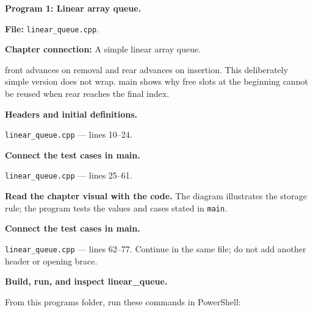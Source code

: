 \textbf{Program 1: Linear array queue.}

\textbf{File:} \texttt{linear\_queue.cpp}.

\textbf{Chapter connection:} A simple linear array queue.

front advances on removal and rear advances on insertion. This deliberately simple version does not wrap. main shows why free slots at the beginning cannot be reused when rear reaches the final index.



\begin{utpsteps}\setcounter{enumi}{0}\item \textbf{Headers and initial definitions.}\end{utpsteps}

\texttt{linear\_queue.cpp} --- lines 10--24.




\tcbbreak

\begin{utpsteps}\setcounter{enumi}{1}\item \textbf{Connect the test cases in main.}\end{utpsteps}

\texttt{linear\_queue.cpp} --- lines 25--61.

\textbf{Read the chapter visual with the code.} The diagram illustrates the storage rule; the program tests the values and cases stated in \texttt{main}.





\tcbbreak

\begin{utpsteps}\setcounter{enumi}{2}\item \textbf{Connect the test cases in main.}\end{utpsteps}

\texttt{linear\_queue.cpp} --- lines 62--77. Continue in the same file; do not add another header or opening brace.






\tcbbreak

\textbf{Build, run, and inspect linear\_queue.}

From this program\textquotesingle s folder, run these commands in PowerShell:

